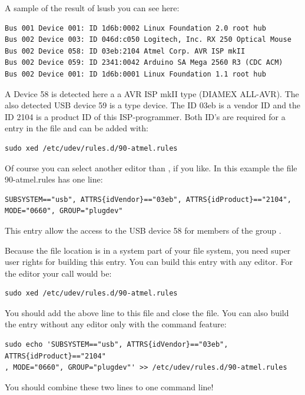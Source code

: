 A sample of the result of lsusb you can see here:
\begin{footnotesize} \begin{verbatim}
Bus 001 Device 001: ID 1d6b:0002 Linux Foundation 2.0 root hub
Bus 002 Device 003: ID 046d:c050 Logitech, Inc. RX 250 Optical Mouse
Bus 002 Device 058: ID 03eb:2104 Atmel Corp. AVR ISP mkII
Bus 002 Device 059: ID 2341:0042 Arduino SA Mega 2560 R3 (CDC ACM)
Bus 002 Device 001: ID 1d6b:0001 Linux Foundation 1.1 root hub
\end{verbatim} \end{footnotesize}
A Device 58 is detected here a a AVR ISP mkII type (DIAMEX ALL-AVR).
The also detected USB device 59 is a  type device.
The ID 03eb is a vendor ID and the ID 2104 is a product ID of this ISP-programmer.
Both ID's are required for a entry in the file 
and can be added with:
\begin{large} \vspace{-0.4em} \begin{verbatim}
sudo xed /etc/udev/rules.d/90-atmel.rules
\end{verbatim} \end{large}
Of course you can select another editor than , if you like.
In this example the file 90-atmel.rules has one line:
\begin{footnotesize} \begin{verbatim}
SUBSYSTEM=="usb", ATTRS{idVendor}=="03eb", ATTRS{idProduct}=="2104", MODE="0660", GROUP="plugdev"
\end{verbatim} \end{footnotesize}
This entry allow the access to the USB device 58 for members of the group .

Because the file location is in a system part of your file system, you need super user rights
for building this entry. You can build this entry with any editor.
For the  editor your call would be:
\begin{large} \vspace{-0.4em} \begin{verbatim}
sudo xed /etc/udev/rules.d/90-atmel.rules
\end{verbatim} \end{large}
You should add the above  line to this file and close the file.
You can also build the entry without any editor only with the command feature:
\begin{footnotesize} \vspace{-0.4em} \begin{verbatim}
sudo echo 'SUBSYSTEM=="usb", ATTRS{idVendor}=="03eb", ATTRS{idProduct}=="2104"
, MODE="0660", GROUP="plugdev"' >> /etc/udev/rules.d/90-atmel.rules
\end{verbatim} \end{footnotesize}
You should combine these two lines to one command line!

